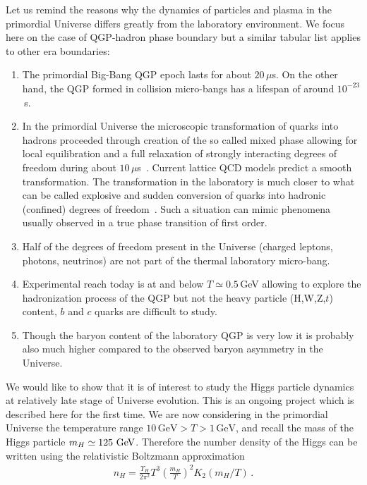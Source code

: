 Let us remind the reasons why the dynamics of particles and plasma in the primordial Universe differs greatly from the laboratory environment. We focus here on the case of QGP-hadron phase boundary but a similar tabular list applies to other era boundaries:
\begin{enumerate} 
\item The primordial Big-Bang QGP epoch lasts for about $20\,\mu$s. On the other hand, the QGP formed in collision micro-bangs has a lifespan of around $10^{-23}$\,s. 
\item In the primordial Universe the microscopic transformation of quarks into hadrons proceeded through creation of the so called mixed phase allowing for local equilibration and a full relaxation of strongly interacting degrees of freedom during about $10\,\mu$s~\cite{Fromerth:2002wb}. Current lattice QCD models predict a smooth transformation. The transformation in the laboratory is much closer to what can be called explosive and sudden conversion of quarks into hadronic (confined) degrees of freedom~\cite{Rafelski:2000by}. Such a situation can mimic phenomena usually observed in a true phase transition of first order.
\item Half of the degrees of freedom present in the Universe (charged leptons, photons, neutrinos) are not part of the thermal laboratory micro-bang.
\item Experimental reach today is at and below $T\simeq 0.5$\,GeV allowing to explore the hadronization process of the QGP but not the heavy particle (H,W,Z,$t$) content, $b$ and $c$ quarks are difficult to study. 
\item Though the baryon content of the laboratory QGP is very low it is probably also much higher compared to the observed baryon asymmetry in the Universe. 
\end{enumerate}
 
We would like to show that it is of interest to study the Higgs particle dynamics at relatively late stage of Universe evolution. This is an ongoing project which is described here for the first time. We are now considering in the primordial Universe the temperature range $10\,\mathrm{GeV}>T>1\,\mathrm{GeV}$, and recall the mass of the Higgs particle $m_H\simeq 125\text{ GeV}$. Therefore the number density of the Higgs can be written using the relativistic Boltzmann approximation
\begin{align}
n_{H}=\frac{\Upsilon_H}{2\pi^2}T^3\left(\frac{m_H}{T}\right)^2 K_2(m_H/T)\,.
\end{align}

